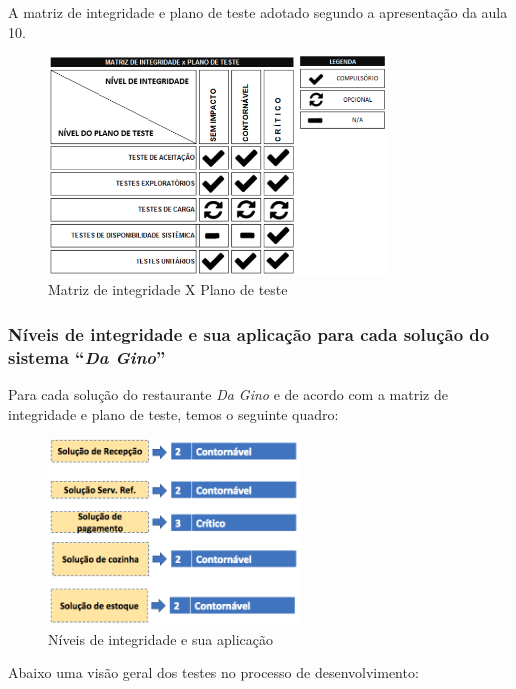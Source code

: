 A matriz de integridade e plano de teste adotado segundo a apresentação da aula 10.

\begin{figure}[H]
  \centering
  \includegraphics[width=0.8\textwidth]{softwareengineer/images/matrix-integrity} 
  \caption{Matriz de integridade X Plano de teste}
  \label{fig:matrix-integrity} 
\end{figure}

\subsubsection{Níveis de integridade e sua aplicação para cada solução do sistema “\textit{Da Gino}”}

Para cada solução do restaurante \textit{Da Gino} e de acordo com a matriz de integridade e plano de teste, temos o seguinte quadro:

\begin{figure}[H]
  \centering
  \includegraphics[width=0.6\textwidth]{softwareengineer/images/da-gino-integrity-level} 
  \caption{Níveis de integridade e sua aplicação}
  \label{fig:da-gino-integrity-level} 
\end{figure}

Abaixo uma visão geral dos testes no processo de desenvolvimento:

